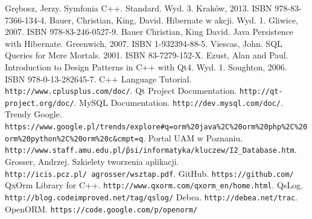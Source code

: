 \documentclass[12pt]{report}
\begin{document}
\begin{thebibliography}{99}
 Grębosz, Jerzy. Symfonia C++. Standard. Wyd. 3. Kraków, 2013. ISBN 978-83-7366-134-4.
 Bauer, Christian, King, David. Hibernate w akcji. Wyd. 1. Gliwice, 2007. ISBN 978-83-246-0527-9.
 Bauer Christian, King David. Java Persistence with Hibernate. Greenwich, 2007. ISBN 1-932394-88-5.
 Viescas, John. SQL Queries for Mere Mortals. 2001. ISBN 83-7279-152-X.
 Ezust, Alan and Paul. Introduction to Design Patterns in C++ with Qt4. Wyd. 1. Soughton, 2006. ISBN 978-0-13-282645-7.
 C++ Language Tutorial. {\tt http://www.cplusplus.com/doc/}.
Qt Project Documentation. {\tt http://qt-project.org/doc/}.
 MySQL Documentation. {\tt http://dev.mysql.com/doc/}.
 Trendy Google. {\tt https://www.google.pl/trends/explore\#q=orm\%20\-java\%2C\%20orm\%20php\%2C\%20orm\%20python\%2C\%20orm\%20c\&cmpt=q}.
 Portal UAM w Poznaniu. {\tt http://www.staff.amu.edu.pl/\~psi/\-informatyka/kluczew/I2\_Database.htm}.
 Grosser, Andrzej. Szkielety tworzenia aplikacji. {\tt http://icis.pcz.pl/~agrosser/wsztap.pdf}.
 GitHub. {\tt https://github.com/}
 QxOrm Library for C++. {\tt http://www.qxorm.com/qxorm\_en/home.html}.
 QsLog. {\tt http://blog.codeimproved.net/tag/qslog/}
 Debea. {\tt http://debea.net/trac}.
 OpenORM. {\tt https://code.google.com/p/openorm/}
\end{thebibliography}

\listoffigures

\listoftables

\lstlistoflistings
\end{document}

